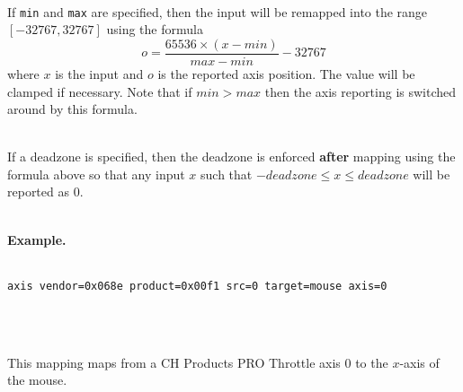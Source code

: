 \documentclass{article}
\begin{document}
\strut\\
If {\tt min} and {\tt max} are specified, then the input will be remapped into the range $[-32767, 32767]$ using the
formula
$$
    o = \frac{65536\times(x-min)}{max-min} - 32767
$$
where $x$ is the input and $o$ is the reported axis position.
The value will be clamped if necessary. Note that if $min > max$ then the axis reporting is switched around by this formula.

\strut\\
If a deadzone is specified, then the deadzone is enforced {\bf after} mapping using the formula above so that any input $x$ such
that $-deadzone \leq x \leq deadzone$ will be reported as $0$.

\strut\\
{\bf Example.}\\
\strut\\
{\tt axis vendor=0x068e product=0x00f1 src=0 target=mouse axis=0}
\strut\\
\strut\\
This mapping maps from a CH Products PRO Throttle axis 0 to the $x$-axis of the mouse.
\end{document}
